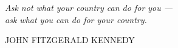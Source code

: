 {
	\null\vfill

	\newlength\longest%
	\settowidth{}
	\centering
	\parbox{\longest}{%
		\raggedright{\LARGE\itshape%
			Ask not what your country can do for you --- \\
			ask what you can do for your country.\/\par\bigskip
		}
		\raggedleft\Large\MakeUppercase{John Fitzgerald Kennedy}\par%
	}

	\vfill\vfill
}
